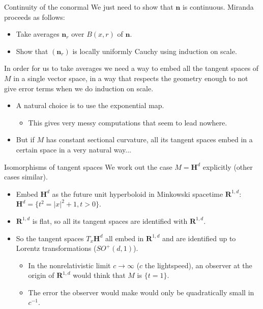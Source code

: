 \documentclass[10pt]{beamer}
\newcommand{\RR}{\mathbf{R}}
\newcommand{\Hyp}{\mathbf H}
\newcommand{\normal}{\mathbf n}
\begin{document}
\begin{frame}{Continuity of the conormal}
We just need to show that $\normal$ is continuous.
Miranda proceeds as follows:

\begin{itemize}
\item Take averages $\normal_r$ over $B(x, r)$ of $\normal$.
\item Show that $(\normal_r)$ is locally uniformly Cauchy using induction on scale.
\end{itemize}

In order for us to take averages we need a way to embed all the tangent spaces of $M$ in a single vector space, in a way that respects the geometry enough to not give error terms when we do induction on scale.
\begin{itemize}
\item A natural choice is to use the exponential map.
\begin{itemize} \item This gives very messy computations that seem to lead nowhere. \end{itemize}
\item But if $M$ has constant sectional curvature, all its tangent spaces embed in a certain space in a very natural way...
\end{itemize}
\end{frame}

\begin{frame}{Isomorphisms of tangent spaces}
We work out the case $M = \Hyp^d$ explicitly (other cases similar).
\begin{itemize}
\item Embed $\Hyp^d$ as the future unit hyperboloid in Minkowski spacetime $\RR^{1, d}$: $\Hyp^d = \{t^2 = |x|^2 + 1, t > 0\}$.
\item $\RR^{1, d}$ is flat, so all its tangent spaces are identified with $\RR^{1, d}$.
\item So the tangent spaces $T_x\Hyp^d$ all embed in $\RR^{1, d}$ and are identified up to Lorentz transformations ($SO^+(d, 1)$).
\begin{itemize}
\item In the nonrelativistic limit $c \to \infty$ ($c$ the lightspeed), an observer at the origin of $\RR^{1, d}$ would think that $M$ is $\{t = 1\}$.
\item The error the observer would make would only be quadratically small in $c^{-1}$.
\end{itemize}
\end{itemize}
\end{frame}
\end{document}
